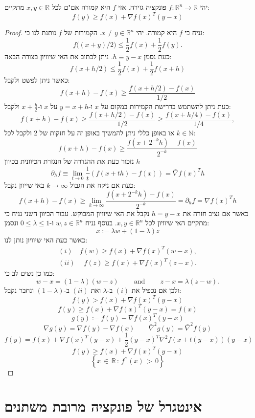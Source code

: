 \documentclass{tstextbook}
\begin{document}
\begin{proposition}
יהי \(f:\mathbb{R}^{n}\to \mathbb{R}\) פונקציה גזירה. אזי \(f\) היא קמורה אם"ם לכל \(x,y \in \mathbb{R}\) מתקיים:
$$f(y)\geq f(x)+\nabla f(x)^{T}(y-x)$$

\end{proposition}
\begin{proof}
נניח כי \(f\) היא קמורה. יהי \(x\neq y \in \mathbb{R}^{n}\). הקמירות של \(f\) נותנת לנו כי:
$$f{\big(}(x+y)/2{\big)}\leq{\frac{1}{2}}f(x)+{\frac{1}{2}}f(y).$$
כעת נסמן \(h\equiv y-x\). ניתן לכתוב את האי שיוויון בצורה הבאה:
$$f(x+h/2)\leq{\frac{1}{2}}f(x)+{\frac{1}{2}}f(x+h)$$
כאשר ניתן לפשט ולקבל:
$$f(x+h)-f(x)\geq{\frac{f(x+h/2)-f(x)}{1/2}}$$
כעת ניתן להשתמש בדרישת הקמירות במקום על \(x\) ו-\(y=x+h\) על \(x\) ו-\(x+\frac{h}{2}\) ולקבל:
$$f(x+h)-f(x)\geq{\frac{f(x+h/2)-f(x)}{1/2}}\geq{\frac{f(x+h/4)-f(x)}{1/4}},$$
או באופן כללי ניתן להמשיך באופן זה על חזקות של 2 ולקבל לכל \(k \in \mathbb{N}\):
$$f(x+h)-f(x)\geq{\frac{f(x+2^{-k}h)-f(x)}{2^{-k}}}$$
נזכור כעת את ההגדרה של הנגזרת הכיוונית בכיוון \(h\)$$\partial_{h} f\equiv \lim_{ t \to 0 } \frac{1}{t}(f(x+th)-f(x)) = \bar{\nabla} f(x)^{T}h$$
כעת אם ניקח את הגבול \(k\to \infty\) באי שייוון נקבל:
$$f(x+h)-f(x)\geq\operatorname*{lim}_{k\to\infty}{\frac{f(x+2^{-k}h)-f(x)}{2^{-k}}}=\partial_{h}f=\nabla f(x)^{T}h$$
כאשר אם נציב חזרה את \(h=y-x\) נקבל את האי שיוויון המבוקש. 
עבור הכיוון השני נניח כי מתקיים האי שיוויון לכל \(x, y \in \mathbb{R}^{n}\). בנוסף נניח \(w,z \in \mathbb{R}^{n}\) ו-\(0\leq \lambda \leq 1\) ונסמן:
$$x:= \lambda w+\left( 1-\lambda \right) z$$
כאשר כעת האי שיוויון נותן לנו:
$$\begin{array}{c}{(i)\quad {f(w)\geq f(x)+\nabla f(x)^{T}(w-x),}}\\ (ii)\quad \;{{f(z)\geq f(x)+\nabla f(x)^{T}(z-x).}}\end{array}$$
כמו כן נשים לב כי:
$$w-x=(1-\lambda)(w-z)\qquad{\mathrm{~and~}}\qquad z-x=\lambda(z-w).$$
ולכן אם נכפיל את \((i)\) ב-\(\lambda\) ואת \((ii)\) ב-\(\left( 1-\lambda \right)\) ונחבר נקבל:
$$f(y)>f(x)+\nabla f(x)^{T}(y-x)$$$$f(y)\geq f(x)+\nabla f(x)^{T}(y-x)=f(x)$$$$g(y):=f(y)-\nabla f(x)^{T}(y-x)$$$$\nabla g(y)=\nabla f(y)-\nabla f(x) \qquad \bar{\nabla}^2 g(y)=\bar{\nabla}^2 f(y)$$$$f(y)=f(x)+\nabla f(x)^{T}(y-x)+{\frac{1}{2}}(y-x)^{T}\nabla^{2}f(x+t(y-x))(y-x)$$$$f(y)\geq f(x)+\nabla f(x)^{T}(y-x)$$$$\left\{x\,\in\,\mathbb{R}\,:\,f^{\prime\prime}(x)\,>\,0\right\}$$

\end{proof}
\chapter{אינטגרל של פונקציה מרובת משתנים}
\end{document}

